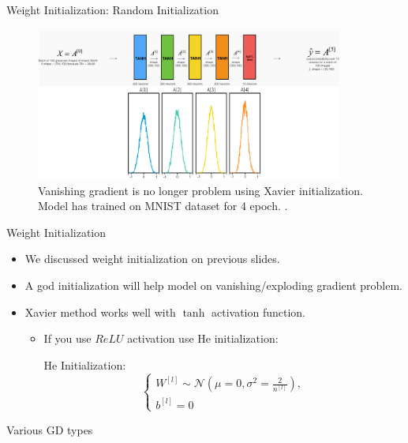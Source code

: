\begin{frame}{Weight Initialization: Random Initialization}
	\begin{figure}[H]
		\centering
		\includegraphics[width=0.9\textwidth]{Images/xavier-init.png}
		\caption{Vanishing gradient is no longer problem using Xavier initialization. Model has trained on MNIST dataset for 4 epoch. \cite{katanforoosh-kunin}.}
	\end{figure}
\end{frame}

\begin{frame}{Weight Initialization}
	\begin{itemize}
		\item We discussed weight initialization on previous slides.
		\item A god initialization will help model on vanishing/exploding gradient problem.
		\item Xavier method works well with $\tanh$ activation function.
		\begin{itemize}
			\item If you use $ReLU$ activation use He initialization:
			\begin{block}{He Initialization:}
				\setlength{\textwidth}{0.4\textwidth}
				\[
				\begin{cases}
					W^{[l]} \sim \mathcal{N}\left(\mu=0, \sigma^2=\frac{2}{n^{[l]}}\right), \\
					b^{[l]} = 0
				\end{cases}
				\]
			\end{block}
		\end{itemize}
	\end{itemize}
\end{frame}

\begin{frame}{Various GD types}
    
\end{frame}